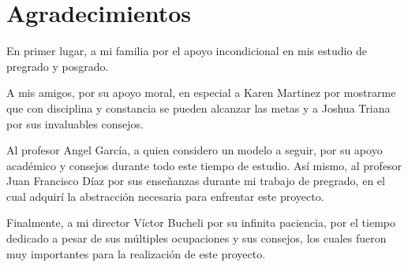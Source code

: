 \section*{Agradecimientos}

En primer lugar, a mi familia por el apoyo incondicional en mis estudio de pregrado y posgrado.

A mis amigos, por su apoyo moral, en especial a Karen Martinez por mostrarme que con disciplina y constancia se pueden alcanzar las metas y a Joshua Triana por sus invaluables consejos.

Al profesor Angel García, a quien considero un modelo a seguir, por su apoyo académico y consejos durante todo este tiempo de estudio. Así mismo, al profesor Juan Francisco Díaz por sus enseñanzas durante mi trabajo de pregrado, en el cual adquirí la abstracción necesaria para enfrentar este proyecto.

Finalmente, a mi director Víctor Bucheli por su infinita paciencia, por el tiempo dedicado a pesar de sus múltiples ocupaciones y sus consejos, los cuales fueron muy importantes para la realización de este proyecto.